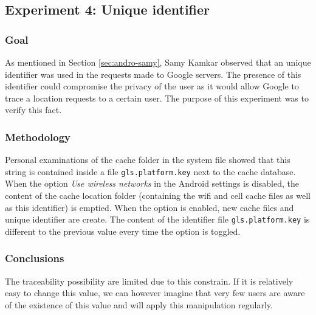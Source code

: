 \subsection{Experiment 4: Unique identifier}

\subsubsection{Goal}

As mentioned in Section \ref{sec:andro-samy}, Samy Kamkar observed that an unique identifier was used in the requests made to Google servers.
The presence of this identifier could compromise the privacy of the user as it would allow Google to trace a location requests to a certain user.
The purpose of this experiment was to verify this fact.

\subsubsection{Methodology}

Personal examinations of the cache folder in the system file showed that this string is contained inside a file \texttt{gls.platform.key} next to the cache database.
When the option \emph{Use wireless networks} in the Android settings is disabled, the content of the cache location folder (containing the wifi and cell cache files as well as this identifier) is emptied.
When the option is enabled, new cache files and unique identifier are create.
The content of the identifier file \texttt{gls.platform.key} is different to the previous value every time the option is toggled.

\subsubsection{Conclusions}

The traceability possibility are limited due to this constrain.
If it is relatively easy to change this value, we can however imagine that very few users are aware of the existence of this value and will apply this manipulation regularly.




